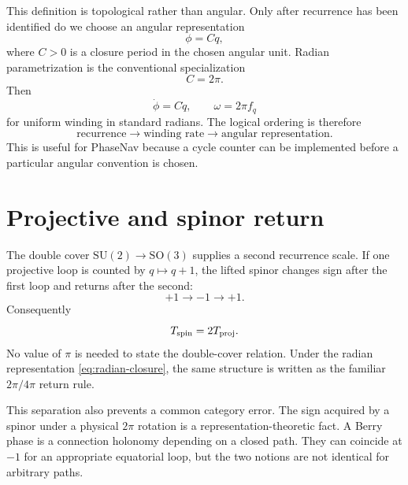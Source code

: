 This definition is topological rather than angular.  Only after recurrence has
been identified do we choose an angular representation
\begin{equation}
 \phi=Cq,
 \label{eq:phase-closure-C}
\end{equation}
where $C>0$ is a closure period in the chosen angular unit.  Radian
parametrization is the conventional specialization
\begin{equation}
 C=2\pi.
 \label{eq:radian-closure}
\end{equation}
Then
\begin{equation}
 \dot\phi=C\dot q,
 \qquad
 \omega=2\pi f_q
\end{equation}
for uniform winding in standard radians.  The logical ordering is therefore
\begin{equation}
 \boxed{
 \text{recurrence}
 \longrightarrow
 \text{winding rate}
 \longrightarrow
 \text{angular representation}.
 }
 \label{eq:recurrence-order}
\end{equation}
This is useful for PhaseNav because a cycle counter can be implemented before a
particular angular convention is chosen.

\section{Projective and spinor return}

The double cover $\mathrm{SU}(2)\to\mathrm{SO}(3)$ supplies a second recurrence
scale.  If one projective loop is counted by $q\mapsto q+1$, the lifted spinor
changes sign after the first loop and returns after the second:
\begin{equation}
 +1\longrightarrow-1\longrightarrow+1.
 \label{eq:spinor-sheet-return}
\end{equation}
Consequently
\begin{equation}
 T_{\rm spin}=2T_{\rm proj}.
 \label{eq:spinor-projective-periods}
\end{equation}
No value of $\pi$ is needed to state the double-cover relation.  Under the
radian representation \eqref{eq:radian-closure}, the same structure is written
as the familiar $2\pi/4\pi$ return rule.

This separation also prevents a common category error.  The sign acquired by a
spinor under a physical $2\pi$ rotation is a representation-theoretic fact.
A Berry phase is a connection holonomy depending on a closed path.  They can
coincide at $-1$ for an appropriate equatorial loop, but the two notions are not
identical for arbitrary paths.


